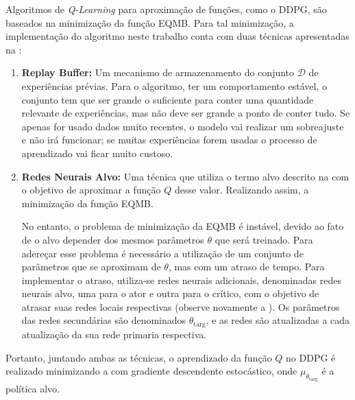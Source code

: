 
Algoritmos de \emph{Q-Learning} para aproximação de funções, como o \acrshort{DDPG}, são baseados na minimização da função \acrshort{EQMB}. Para tal minimização, a implementação do algoritmo neste trabalho conta com duas técnicas apresentadas na :

\begin{enumerate}
    \item \textbf{Replay Buffer:} Um mecanismo de armazenamento do conjunto ${\mathcal D}$ de experiências prévias. Para o algoritmo, ter um comportamento estável, o conjunto tem que ser grande o suficiente para conter uma quantidade relevante de experiências, mas não deve ser grande a ponto de conter tudo. Se apenas for usado dados muito recentes, o modelo vai realizar um sobreajuste e não irá funcionar; se muitas experiências forem usadas o processo de aprendizado vai ficar muito custoso.
    
    \item \textbf{Redes Neurais Alvo:} Uma técnica que utiliza o termo alvo descrito na  com o objetivo de aproximar a função $Q$ desse valor. Realizando assim, a minimização da função \acrshort{EQMB}.

    
    No entanto, o problema de minimização da \acrshort{EQMB} é instável, devido ao fato de o alvo depender dos mesmos parâmetros $\theta$ que será treinado. Para adereçar esse problema é necessário a utilização de um conjunto de parâmetros que se aproximam de $\theta$, mas com um atraso de tempo. Para implementar o atraso, utiliza-se redes neurais adicionais, denominadas redes neurais alvo, uma para o ator e outra para o crítico, com o objetivo de atrasar suas redes locais respectivas (observe novamente a ). Os parâmetros das redes secundárias são denominados $\theta_{\text{targ}}$, e as redes são atualizadas a cada atualização da sua rede primaria respectiva.
\end{enumerate}

Portanto, juntando ambas as técnicas, o aprendizado da função $Q$ no \acrshort{DDPG} é realizado minimizando a  com gradiente descendente estocástico, onde $\mu_{\theta_{\text{targ}}}$ é a política alvo.

